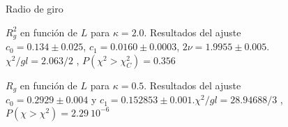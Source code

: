 \begin{figure}[h]
  \centering
  
  \caption{Radio de giro}\label{radio-giro-fig}
\end{figure}

\begin{figure}[h]
  \centering
  
  \caption{$R^2_g$ en función de $L$ para $\kappa=2.0$. Resultados del ajuste
    $c_0=0.134\pm 0.025$, $c_1=0.0160\pm 0.0003$, $2\nu=1.9955 \pm
    0.005$. $\chi^2/gl=2.063/2$ , $P(\chi^2>\chi_C^2)=0.356$}\label{Rg2_plana}







\end{figure}



\begin{figure}[h]
  \centering
  
   \caption{$R_g$ en función de $L$ para $\kappa=0.5$. Resultados del ajuste
     $c_0=0.2929 \pm 0.004$ y $c_1=0.152853\pm 0.001$.$\chi^2/gl=28.94688/3$ ,
     $P(\chi>\chi^2)=2.29\ 10^{-6}$}\label{rg2_rugosa}







\end{figure}

